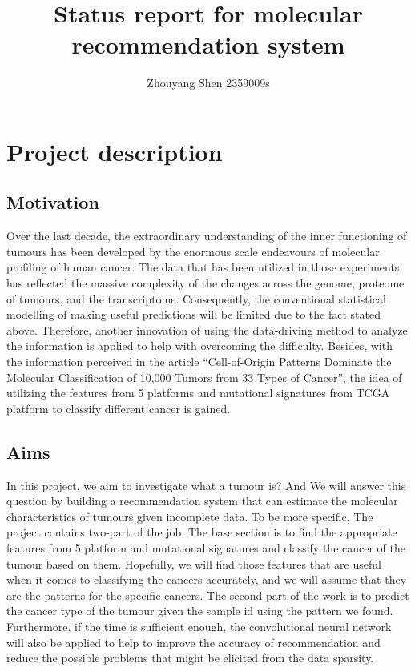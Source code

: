 \documentclass[11pt]{article}
\title{Status report for molecular recommendation system}
\author{Zhouyang Shen 2359009s}
\begin{document}
    \maketitle
    
    
     



\section{Project description}\label{project-description}

\subsection{Motivation}\label{motivation}
Over the last decade, the extraordinary understanding of the inner functioning of tumours has been developed by the enormous scale endeavours of molecular profiling of human cancer. The data that has been utilized in those experiments has reflected the massive complexity of the changes across the genome, proteome of tumours, and the transcriptome. Consequently, the conventional statistical modelling of making useful predictions will be limited due to the fact stated above. Therefore, another innovation of using the data-driving method to analyze the information is applied to help with overcoming the difficulty. Besides, with the information perceived in the article “Cell-of-Origin Patterns Dominate the Molecular Classification of 10,000 Tumors from 33 Types of Cancer”, the idea of utilizing the features from 5 platforms and mutational signatures from TCGA platform to classify different cancer is gained.


\subsection{Aims}\label{aims}
In this project, we aim to investigate what a tumour is? And We will answer this question by building a recommendation system that can estimate the molecular characteristics of tumours given incomplete data. To be more specific, The project contains two-part of the job. The base section is to find the appropriate features from 5 platform and mutational signatures and classify the cancer of the tumour based on them. Hopefully, we will find those features that are useful when it comes to classifying the cancers accurately, and we will assume that they are the patterns for the specific cancers. The second part of the work is to predict the cancer type of the tumour given the sample id using the pattern we found. Furthermore, if the time is sufficient enough, the convolutional neural network will also be applied to help to improve the accuracy of recommendation and reduce the possible problems that might be elicited from the data sparsity.
\end{document}
